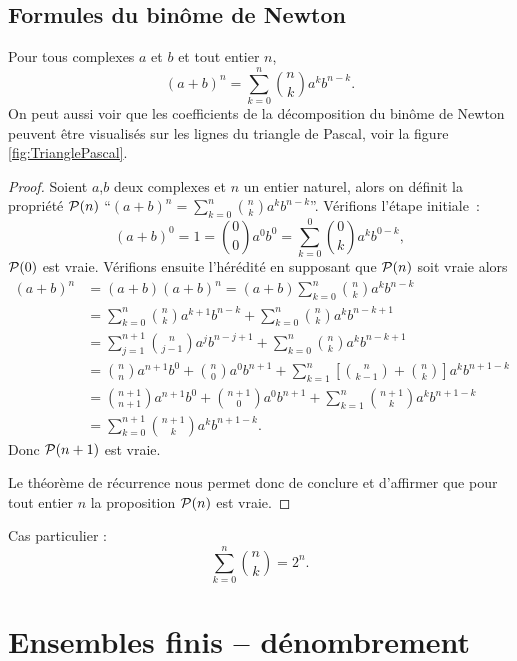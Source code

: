 \subsection{Formules du binôme de Newton}

\begin{prop}
  Pour tous complexes \(a\) et \(b\) et tout entier \(n\),
  \begin{equation}
    (a+b)^n=\sum_{k=0}^n \binom{n}{k}a^kb^{n-k}.
  \end{equation}
  On peut aussi voir que les coefficients de la décomposition du binôme de Newton peuvent être visualisés sur les lignes du triangle de Pascal, voir la figure
\ref{fig:TrianglePascal}.
\end{prop}
\begin{proof}
  Soient \(a\),\(b\) deux complexes et \(n\) un entier naturel, alors on définit la propriété \(\P(n)\) ``\((a+b)^n=\sum_{k=0}^n \binom{n}{k}a^kb^{n-k}\)''. Vérifions l'étape initiale~:
\begin{equation}
  (a+b)^0=1=\binom{0}{0}a^0b^0=\sum_{k=0}^0 \binom{0}{k}a^kb^{0-k},
\end{equation}
\(\P(0)\) est vraie. Vérifions ensuite l'hérédité en supposant que \(\P(n)\) soit vraie alors
\begin{align}
  (a+b)^n&=(a+b)(a+b)^n=(a+b)\sum_{k=0}^n \binom{n}{k}a^kb^{n-k}\\
  &=\sum_{k=0}^n \binom{n}{k}a^{k+1}b^{n-k}+\sum_{k=0}^n \binom{n}{k}a^kb^{n-k+1}\\
  &=\sum_{j=1}^{n+1} \binom{n}{j-1}a^{j}b^{n-j+1}+\sum_{k=0}^n \binom{n}{k}a^kb^{n-k+1}\\
  &=\binom{n}{n}a^{n+1}b^0 +\binom{n}{0}a^0b^{n+1} + \sum_{k=1}^{n}\left[\binom{n}{k-1}+\binom{n}{k}\right]a^kb^{n+1-k}\\
  &=\binom{n+1}{n+1}a^{n+1}b^0+\binom{n+1}{0}a^0b^{n+1}+ \sum_{k=1}^{n}\binom{n+1}{k}a^kb^{n+1-k}\\
  &=\sum_{k=0}^{n+1}\binom{n+1}{k}a^kb^{n+1-k}.
\end{align}
Donc \(\P(n+1)\) est vraie.

Le théorème de récurrence nous permet donc de conclure et d'affirmer que pour tout entier \(n\) la proposition \(\P(n)\) est vraie.
\end{proof}
Cas particulier :
\begin{equation}
  \sum_{k=0}^n \binom{n}{k}=2^n.
\end{equation}

\section{Ensembles finis -- dénombrement}

